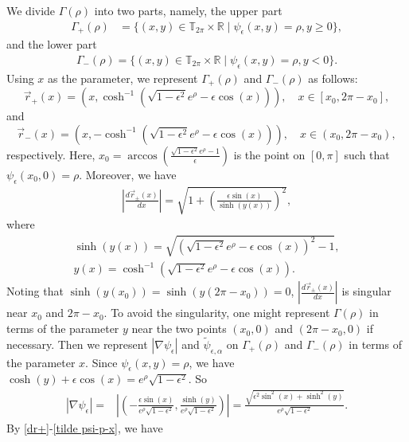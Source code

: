 \documentclass[1 [leqno, 11pt]{amsart}
\numberwithin{equation}{section}
\let\ep=\epsilon
\begin{document}
\begin{CJK*}{GBK}{song}
We divide $\Gamma(\rho)$ into two parts, namely, the upper part
\begin{align*}
\Gamma_{+} (\rho)
& = \{(x, y) \in \mathbb{T}_{2\pi} \times \mathbb{R}  \;|\;  \psi_\ep(x,y) = \rho,  y \geq 0\},
\end{align*}
and the lower part
\begin{align*}
\Gamma_{-} (\rho) = \{(x, y) \in \mathbb{T}_{2\pi} \times \mathbb{R}\;|\;  \psi_\ep(x,y) = \rho,  y < 0\}.
\end{align*}
 Using $x$ as the parameter,
we  represent $\Gamma_{+}(\rho)$ and $\Gamma_{-}(\rho)$ as follows:
$$\vec{r}_{+} (x) = (x, \cosh^{-1}(\sqrt{1-\ep^2} e^{\rho} - \ep \cos(x))), \quad x \in [ x_0, 2\pi - x_0], $$
and
$$\vec{r}_{-} (x) = (x, -\cosh^{-1}(\sqrt{1-\ep^2} e^{\rho} - \ep \cos(x))), \quad x \in ( x_0, 2\pi - x_0), $$
respectively. Here, $x_0 = \arccos\left( \frac{\sqrt{1-\ep^2} e^\rho - 1}{\ep} \right) $ is the point on $[0, \pi]$ such that $\psi_\ep(x_0,0)=\rho$.
Moreover, we have
\begin{align}\label{dr+}
\left|\frac{d \vec{r}_{\pm}(x)}{dx}\right| = \sqrt{ 1 + \left(\frac{\ep \sin(x)}{\sinh(y(x))}\right)^2},
\end{align}
where
\begin{align}\label{sinhyx}
 \sinh(y(x))=\sqrt{( \sqrt{1-\ep^2} e^{\rho} - \ep \cos(x) )^2 - 1},\\\nonumber
 y(x)=\cosh^{-1}(\sqrt{1-\ep^2} e^{\rho} - \ep \cos(x)).
 \end{align}
Noting that $\sinh(y(x_0))=\sinh(y(2\pi-x_0))=0$, $\left|\frac{d \vec{r}_{\pm}(x)}{dx}\right|$ is singular near $x_0$ and $2\pi-x_0$. To avoid the singularity, one might represent $\Gamma(\rho)$ in terms of the parameter $y$ near the two points $(x_0,0)$ and $(2\pi-x_0,0)$ if necessary.
Then we  represent $\left| \nabla \psi_\ep \right| $ and $\widetilde{\psi}_{\ep,\alpha}$ on $\Gamma_{+}(\rho)$ and $\Gamma_{-}(\rho)$ in terms of the parameter $x$. Since
$\psi_\ep(x,y) = \rho$, we have $\cosh(y) + \ep \cos(x) = e^\rho \sqrt{1-\ep^2}$. So
\begin{align}\label{tilde psi-p-x}
\left| \nabla \psi_\ep \right|
= & \left| \left( - \frac{\ep \sin(x)}{e^\rho \sqrt{1-\ep^2}}, \frac{\sinh(y)}{e^\rho \sqrt{1-\ep^2}} \right) \right|
=  \frac{\sqrt{\ep^2 \sin^2(x) + \sinh^2(y)}}{e^\rho \sqrt{1-\ep^2}}.
\end{align}
By \eqref{dr+}-\eqref{tilde psi-p-x}, we have
\begin{align}\nonumber

\end{align}
\end{CJK*}
\end{document}
